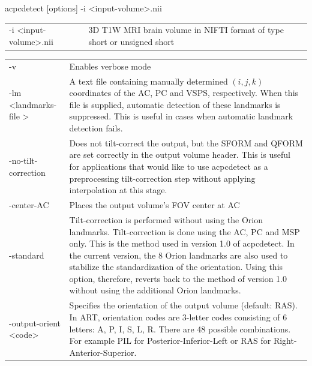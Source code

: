 \documentclass[11pt]{article}
\begin{document}

acpcdetect [options] -i \textless input-volume\textgreater.nii \\


\begin{longtable}{p{}p{}}
-i \textless input-volume\textgreater.nii &
3D T1W MRI brain volume in NIFTI format of type short or unsigned short 
\end{longtable}


\begin{longtable}{p{}p{}}
-v & Enables verbose mode \\

-lm \textless landmarks-file \textgreater &
A text file containing manually determined $(i, j, k)$ coordinates
of the AC, PC and VSPS, respectively. When this file is supplied,
automatic detection of these landmarks is suppressed. This is useful
in cases when automatic landmark detection fails.\\

-no-tilt-correction & 
Does not tilt-correct the output, but the SFORM and QFORM are set
correctly in the output volume header. This is useful for applications
that would like to use acpcdetect as a preprocessing tilt-correction
step without applying interpolation at this stage.  \\ 

-center-AC &
Places the output volume's FOV center at AC \\

-standard &
Tilt-correction is performed without using the Orion landmarks.
Tilt-correction is done using the AC, PC and MSP only. This is the
method used in version 1.0 of acpcdetect.  In the current version, the
8 Orion landmarks are also used to stabilize the standardization of the
orientation. Using this option, therefore, reverts back to the method
of version 1.0 without using the additional Orion landmarks. \\

-output-orient \textless code\textgreater  &
Specifies the orientation of the output volume (default: RAS). 
In ART, orientation codes are 3-letter codes consisting of 6 letters:
A, P, I, S, L, R.  There are 48 possible combinations. For example
PIL for Posterior-Inferior-Left or RAS for Right-Anterior-Superior. \\


\end{longtable}
\end{document}
